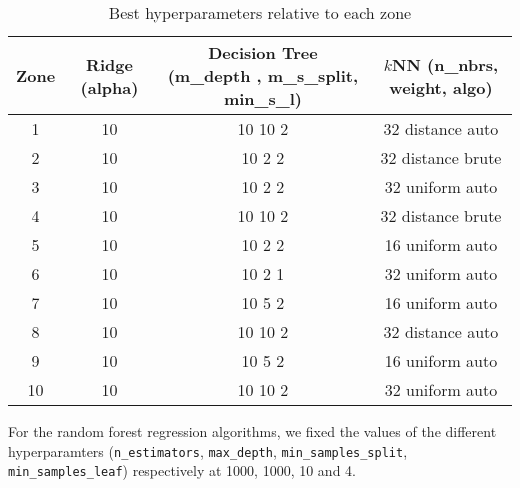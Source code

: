 \begin{table}[H]
\centering
\begin{tabular}{|c|c|c|c|}
\hline
Zone & Ridge (alpha) & Decision Tree (m\_depth , m\_s\_split, min\_s\_l) & $k$NN (n\_nbrs, weight, algo) \\ \hline
1    & 10 & 10 10 2 & 32 distance auto \\ \hline
2    & 10 & 10 2 2 & 32 distance brute \\ \hline
3    & 10 & 10 2 2 & 32 uniform auto \\ \hline
4    & 10 & 10 10 2 & 32 distance brute \\ \hline
5    & 10 & 10 2 2 & 16 uniform auto \\ \hline
6    & 10 & 10 2 1 & 32 uniform auto\\ \hline
7    & 10 & 10 5 2 & 16 uniform auto \\ \hline
8    & 10 & 10 10 2 & 32 distance auto \\ \hline
9    & 10 & 10 5 2 & 16 uniform auto \\ \hline
10   & 10 & 10 10 2 & 32 uniform auto \\ \hline
\end{tabular}
\caption{Best hyperparameters relative to each zone}
\label{tab:hyper-zones}
\end{table}

For the random forest regression algorithms, we fixed the values of the different hyperparamters (\verb|n_estimators|, \verb|max_depth|, \verb|min_samples_split|, \verb|min_samples_leaf|) respectively at 1000, 1000, 10 and 4.